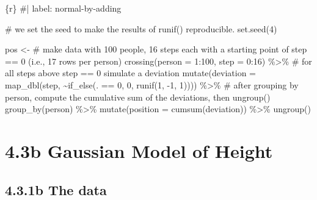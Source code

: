 \documentclass[
  letterpaper,
  DIV=11,
  numbers=noendperiod]{scrreprt}
\newenvironment{Shaded}{\begin{snugshade}}{\end{snugshade}}
\newcommand{\AttributeTok}[1]{\textcolor[rgb]{0.40,0.45,0.13}{#1}}
\newcommand{\CommentTok}[1]{\textcolor[rgb]{0.37,0.37,0.37}{#1}}
\newcommand{\DecValTok}[1]{\textcolor[rgb]{0.68,0.00,0.00}{#1}}
\newcommand{\FunctionTok}[1]{\textcolor[rgb]{0.28,0.35,0.67}{#1}}
\newcommand{\InformationTok}[1]{\textcolor[rgb]{0.37,0.37,0.37}{#1}}
\newcommand{\NormalTok}[1]{\textcolor[rgb]{0.00,0.23,0.31}{#1}}
\newcommand{\OtherTok}[1]{\textcolor[rgb]{0.00,0.23,0.31}{#1}}
\newcommand{\SpecialCharTok}[1]{\textcolor[rgb]{0.37,0.37,0.37}{#1}}
\begin{document}
\begin{Shaded}
\begin{Highlighting}[]
\InformationTok{\textasciigrave{}\textasciigrave{}\textasciigrave{}\{r\}}
\CommentTok{\#| label: normal{-}by{-}adding}

\CommentTok{\# we set the seed to make the results of \textasciigrave{}runif()\textasciigrave{} reproducible.}
\FunctionTok{set.seed}\NormalTok{(}\DecValTok{4}\NormalTok{)}

\NormalTok{pos }\OtherTok{\textless{}{-}} 
  \CommentTok{\# make data with 100 people, 16 steps each with a starting point of \textasciigrave{}step == 0\textasciigrave{} (i.e., 17 rows per person)}
  \FunctionTok{crossing}\NormalTok{(}\AttributeTok{person =} \DecValTok{1}\SpecialCharTok{:}\DecValTok{100}\NormalTok{,}
           \AttributeTok{step   =} \DecValTok{0}\SpecialCharTok{:}\DecValTok{16}\NormalTok{) }\SpecialCharTok{\%\textgreater{}\%} 
  \CommentTok{\# for all steps above \textasciigrave{}step == 0\textasciigrave{} simulate a \textasciigrave{}deviation\textasciigrave{}}
  \FunctionTok{mutate}\NormalTok{(}\AttributeTok{deviation =} \FunctionTok{map\_dbl}\NormalTok{(step, }\SpecialCharTok{\textasciitilde{}}\FunctionTok{if\_else}\NormalTok{(. }\SpecialCharTok{==} \DecValTok{0}\NormalTok{, }\DecValTok{0}\NormalTok{, }\FunctionTok{runif}\NormalTok{(}\DecValTok{1}\NormalTok{, }\SpecialCharTok{{-}}\DecValTok{1}\NormalTok{, }\DecValTok{1}\NormalTok{)))) }\SpecialCharTok{\%\textgreater{}\%} 
  \CommentTok{\# after grouping by \textasciigrave{}person\textasciigrave{}, compute the cumulative sum of the deviations, then \textasciigrave{}ungroup()\textasciigrave{}}
  \FunctionTok{group\_by}\NormalTok{(person) }\SpecialCharTok{\%\textgreater{}\%}
  \FunctionTok{mutate}\NormalTok{(}\AttributeTok{position =} \FunctionTok{cumsum}\NormalTok{(deviation)) }\SpecialCharTok{\%\textgreater{}\%} 
  \FunctionTok{ungroup}\NormalTok{() }
\InformationTok{\textasciigrave{}\textasciigrave{}\textasciigrave{}}
\end{Highlighting}
\end{Shaded}

\hypertarget{b-gaussian-model-of-height}{%
\section{4.3b Gaussian Model of
Height}\label{b-gaussian-model-of-height}}

\hypertarget{b-the-data}{%
\subsection{4.3.1b The data}\label{b-the-data}}
\end{document}
